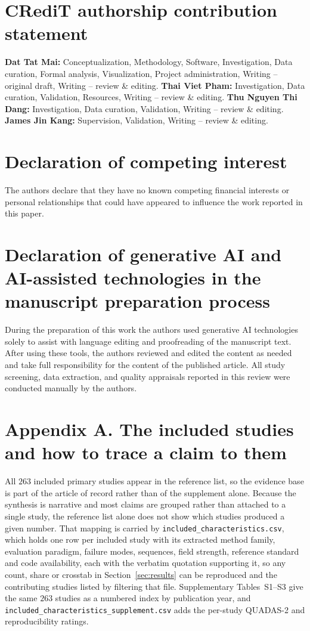 \documentclass[review,authoryear]{elsarticle}
\begin{document}
\section*{CRediT authorship contribution statement}
\textbf{Dat Tat Mai:} Conceptualization, Methodology, Software, Investigation,
Data curation, Formal analysis, Visualization, Project administration,
Writing -- original draft, Writing -- review \& editing.
\textbf{Thai Viet Pham:} Investigation, Data curation, Validation, Resources,
Writing -- review \& editing.
\textbf{Thu Nguyen Thi Dang:} Investigation, Data curation, Validation,
Writing -- review \& editing.
\textbf{James Jin Kang:} Supervision, Validation, Writing -- review \& editing.

\section*{Declaration of competing interest}
The authors declare that they have no known competing financial interests or
personal relationships that could have appeared to influence the work reported
in this paper.

\section*{Declaration of generative AI and AI-assisted technologies in the manuscript preparation process}
During the preparation of this work the authors used generative AI technologies solely to
assist with language editing and proofreading of the manuscript text. After using these
tools, the authors reviewed and edited the content as needed and take full responsibility
for the content of the published article. All study screening, data extraction, and quality
appraisals reported in this review were conducted manually by the authors.

\section*{Appendix A. The included studies and how to trace a claim to them}
All $263$ included primary studies appear in the reference list, so the evidence base is
part of the article of record rather than of the supplement alone. Because the synthesis is
narrative and most claims are grouped rather than attached to a single study, the reference
list alone does not show which studies produced a given number. That mapping is carried by
\texttt{included\_characteristics.csv}, which holds one row per included study with its
extracted method family, evaluation paradigm, failure modes, sequences, field strength,
reference standard and code availability, each with the verbatim quotation supporting it,
so any count, share or crosstab in Section~\ref{sec:results} can be reproduced and the
contributing studies listed by filtering that file. Supplementary Tables~S1--S3 give the
same $263$ studies as a numbered index by publication year, and
\texttt{included\_characteristics\_supplement.csv} adds the per-study QUADAS-2 and
reproducibility ratings.
\end{document}

